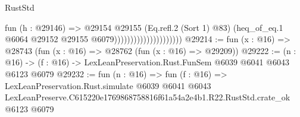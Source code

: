 \begin{lexlean}{RustStd}
\begin{coremodule}
                                          fun (h : @29146) =>
                                          @29154
                                            @29155
                                            (Eq.refl.{2} (Sort 1) @83)
                                            (heq_of_eq.{1}
                                              @6064
                                              @29152
                                              @29155
                                              @6079)))))))))))))))))))))
@29214 := fun (x : @16) => @28743 (fun (x : @16) => @28762 (fun (x : @16) => @29209))
@29222 := (n : @16) -> (f : @16) -> LexLeanPreservation.Rust.FunSem @6039 @6041 @6043 @6123 @6079
@29232 := fun (n : @16) =>
  fun (f : @16) =>
  LexLeanPreservation.Rust.simulate
    @6039
    @6041
    @6043
    LexLeanPreserve.C615220e1769868758816f61a54a2e4b1.R22.RustStd.crate_ok
    @6123
    @6079
\end{coremodule}
\end{lexlean}
